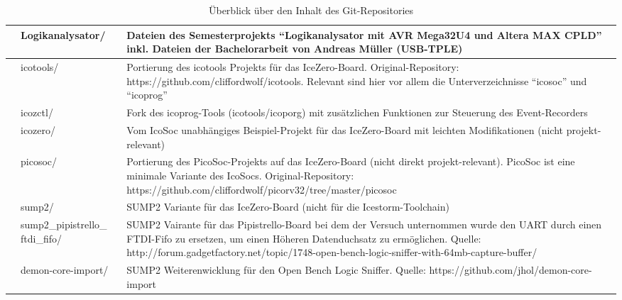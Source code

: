 \begin{table}[h]
\begin{tabular}{|p{1cm}|p{3cm}|p{10cm}|}
            & Logikanalysator/                & Dateien des Semesterprojekts ``Logikanalysator mit AVR Mega32U4 und Altera MAX CPLD''  inkl. Dateien der Bachelorarbeit von Andreas Müller (USB-TPLE)  
															     \\ \hline
            & icotools/                       & Portierung des icotools Projekts für das IceZero-Board. Original-Repository: https://github.com/cliffordwolf/icotools. Relevant sind hier vor allem die Unterverzeichnisse ``icosoc'' und ``icoprog'' 
\\ \hline
            & icozctl/                        & Fork des icoprog-Tools (icotools/icoporg) mit zusätzlichen Funktionen zur Steuerung des Event-Recorders                                                                                                                                                                                                                  \\ \hline
            & icozero/                        & Vom IcoSoc unabhängiges Beispiel-Projekt für das IceZero-Board mit leichten Modifikationen (nicht projekt-relevant)                                                                                                                                                                                                      \\ \hline
            & picosoc/                        & Portierung des PicoSoc-Projekts auf das IceZero-Board (nicht direkt projekt-relevant). PicoSoc ist eine minimale Variante des IcoSocs. Original-Repository: https://github.com/cliffordwolf/picorv32/tree/master/picosoc                                                    \\ \hline
            & sump2/                          & SUMP2 Variante für das IceZero-Board (nicht für die Icestorm-Toolchain)                                                                                                                                                                                                                                                  \\ \hline
            & sump2\_pipistrello\_ ftdi\_fifo/ & SUMP2 Vairante für das Pipistrello-Board bei dem der Versuch unternommen wurde den UART durch einen FTDI-Fifo zu ersetzen, um einen Höheren Datenduchsatz zu ermöglichen. Quelle: http://forum.gadgetfactory.net/topic/1748-open-bench-logic-sniffer-with-64mb-capture-buffer/ \\ \hline
            & demon-core-import/              & SUMP2 Weiterenwicklung für den Open Bench Logic Sniffer. Quelle: https://github.com/jhol/demon-core-import                                                                                                                                                                     \\ \hline
\end{tabular}
\caption{Überblick über den Inhalt des Git-Repositories}
\label{tbl:git_repo}
\end{table}
